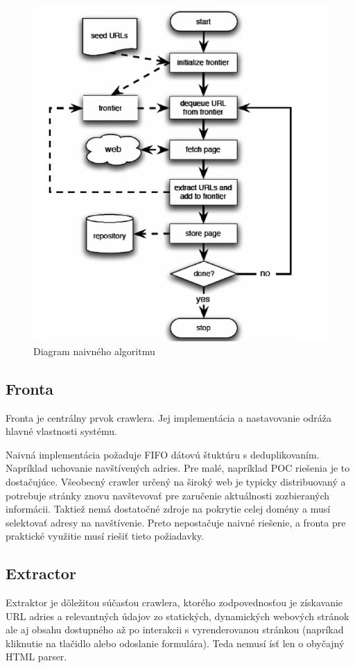 \begin{figure}[!ht]
    \centering
    \includegraphics[width=.9\textwidth]{figures/basicCrawlAlgorithm.png}
    \caption{Diagram naivného algoritmu \label{o:basic_crawl_algorithm} \cite{dataMining}}
\end{figure}

\subsection{Fronta} 
Fronta je centrálny prvok crawlera. Jej implementácia a nastavovanie odráža hlavné vlastnosti systému. 

Naivná implementácia požaduje FIFO dátovú štuktúru s deduplikovaním. Napríklad uchovanie navštívených adries. Pre malé, napríklad POC riešenia je to dostačujúce. 
Všeobecný crawler určený na široký web je typicky distribuovaný a potrebuje stránky znovu navštevovať pre zaručenie aktuálnosti zozbieraných informácii. Taktiež nemá dostatočné zdroje na pokrytie celej domény a musí selektovať adresy na navštívenie. Preto nepostačuje naivné riešenie, a fronta pre praktické využitie musí riešiť tieto požiadavky. 

\subsection{Extractor}
Extraktor je dôležitou súčasťou crawlera, ktorého zodpovednosťou je získavanie URL adries a relevantných údajov zo statických, dynamických webových stránok ale aj obsahu dostupného až po interakcii s vyrenderovanou stránkou (napríkad kliknutie na tlačidlo alebo odoslanie formulára). Teda nemusí ísť len o obyčajný HTML parser. 

